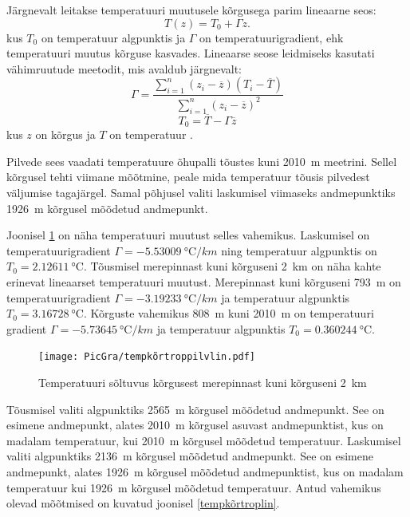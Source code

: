 \documentclass{trkut}%
\begin{document}
Järgnevalt leitakse temperatuuri muutusele kõrgusega parim lineaarne seos:
\begin{equation}
T(z) = T_0 + \Gamma z.
\end{equation}
kus $T_0$ on temperatuur algpunktis ja $\Gamma$ on temperatuurigradient, ehk temperatuuri muutus kõrguse kasvades. Lineaarse seose leidmiseks kasutati vähimruutude meetodit, mis avaldub järgnevalt:
\begin{equation}
\Gamma = \frac{\sum_{i=1}^{n}(z_i - \overline{z})(T_i - \overline{T})}{\sum_{i=1}^{n}(z_i - \overline{z})^2}
\end{equation}
\begin{equation}
T_0 = \overline{T} - \Gamma \overline{z}
\end{equation}
kus $z$ on kõrgus ja $T$ on temperatuur \parencite[252-285]{mat}.

Pilvede sees vaadati temperatuure õhupalli tõustes kuni \SI{2010}{m} meetrini. Sellel kõrgusel tehti viimane mõõtmine, peale mida temperatuur tõusis pilvedest väljumise tagajärgel. Samal põhjusel valiti laskumisel viimaseks andmepunktiks \SI{1926}{m} kõrgusel mõõdetud andmepunkt.

Joonisel \ref{tempkõrtroppilvlin} on näha temperatuuri muutust selles vahemikus. Laskumisel on temperatuurigradient $\Gamma =  \SI{-5.53009}{\degreeCelsius/km}$ ning temperatuur algpunktis on $T_0 = \SI{2.12611}{\degreeCelsius}$. Tõusmisel merepinnast kuni kõrguseni \SI{2}{km} on näha kahte erinevat lineaarset temperatuuri muutust. Merepinnast kuni kõrguseni \SI{793}{m} on temperatuurigradient $\Gamma =\SI{-3.19233}{\degreeCelsius/km}$ ja temperatuur algpunktis $T_0 = \SI{3.16728}{\degreeCelsius}$. Kõrguste vahemikus \SI{808}{m} kuni \SI{2010}{m} on temperatuuri gradient $\Gamma =\SI{-5.73645}{\degreeCelsius/km}$ ja temperatuur algpunktis $T_0 = \SI{0.360244}{\degreeCelsius}$.

\begin{figure}[h]
	\texttt{[image: PicGra/tempkõrtroppilvlin.pdf]}
	\caption{Temperatuuri sõltuvus kõrgusest merepinnast kuni kõrguseni \SI{2}{km}}
	\label{tempkõrtroppilvlin}%
\end{figure}


Tõusmisel valiti algpunktiks \SI{2565}{m} kõrgusel mõõdetud andmepunkt. See on esimene andmepunkt, alates \SI{2010}{m} kõrgusel asuvast andmepunktist, kus on madalam temperatuur, kui \SI{2010}{m} kõrgusel mõõdetud temperatuur. Laskumisel valiti algpunktiks \SI{2136}{m} kõrgusel mõõdetud andmepunkt. See on esimene andmepunkt, alates \SI{1926}{m} kõrgusel mõõdetud andmepunktist, kus on madalam temperatuur kui \SI{1926}{m} kõrgusel mõõdetud temperatuur. Antud vahemikus olevad mõõtmised on kuvatud joonisel \ref{tempkõrtroplin}.
\end{document}
